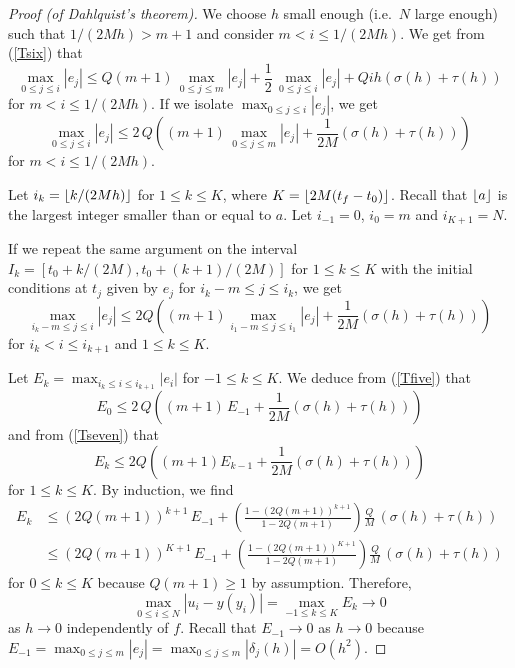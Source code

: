 \begin{proof}[Proof (of Dahlquist's theorem)]
We choose $h$ small enough (i.e.\ $N$ large enough) such
that $1/(2Mh) > m+1$ and consider $m < i \leq 1/(2Mh)$.  We get from
(\ref{Tsix}) that
\[
\max_{0\leq j \leq i} |e_j| \leq
Q(m+1)\,\max_{0\leq j \leq m} |e_j| + \frac{1}{2}\,\max_{0\leq j \leq i} |e_j|
+ Q i h\left(\sigma(h) + \tau(h) \right)
\]
for $m < i \leq 1/(2 M h)$. If we isolate 
$\displaystyle \max_{0\leq j \leq i} |e_j|$, we get
\begin{equation}\label{Tfive}
\max_{0\leq j \leq i} |e_j| \leq
2\,Q\left( (m+1)\,\max_{0\leq j \leq m} |e_j|
+\frac{1}{2M}\left(\sigma(h) + \tau(h) \right) \right)
\end{equation}
for $m < i \leq 1/(2 M h)$.

Let $i_k = \lfloor{k/(2M h)}\rfloor$ for $1 \leq k \leq K$, where
$K=\lfloor{2M(t_f-t_0)}\rfloor$.  Recall that $\lfloor{a}\rfloor$
is the largest integer smaller than or equal to $a$.  Let
$i_{-1} = 0$, $i_0=m$ and $i_{K+1} = N$.

If we repeat the same argument on the interval
$\displaystyle I_k = [t_0+k/(2M), t_0+(k+1)/(2M)]$ for $1 \leq k \leq K$
with the initial conditions at $t_j$ given by $e_j$ for
$\displaystyle i_k-m \leq j \leq i_k$, we get
\begin{equation}\label{Tseven}
\max_{i_k-m \leq j \leq i} |e_j| \leq 2 Q \left( (m+1)
\max_{i_1-m\leq j \leq i_1} |e_j|
+\frac{1}{2 M}\left(\sigma(h) + \tau(h) \right) \right)
\end{equation}
for $i_k < i \leq i_{k+1}$ and $1 \leq k \leq K$.

Let $\displaystyle E_k = \max_{i_k \leq i \leq i_{k+1}} |e_i|$ for
$-1 \leq k \leq K$.  We deduce from (\ref{Tfive}) that
\[
E_0 \leq 2\,Q\left( (m+1)\,E_{-1}
+\frac{1}{2M}\left(\sigma(h) + \tau(h) \right) \right)
\]
and from (\ref{Tseven}) that
\[
E_k \leq 2 Q \left( (m+1) E_{k-1}
+\frac{1}{2 M}\left(\sigma(h) + \tau(h) \right) \right)
\]
for $1 \leq k \leq K$.  By induction, we find
\begin{align*}
E_k & \leq
(2Q(m+1))^{k+1}\,E_{-1} + \left(\frac{1-(2Q(m+1))^{k+1}}{1-2Q(m+1)}\right)
\frac{Q}{M }\,\left(\sigma(h) +\tau(h)\right)  \\
& \leq
(2Q(m+1))^{K+1}\,E_{-1} + \left(\frac{1-(2Q(m+1))^{K+1}}{1-2Q(m+1)}\right)
\frac{Q}{M}\,\left(\sigma(h) +\tau(h)\right)
\end{align*}
for $0\leq k \leq K$ because $Q(m+1) \geq 1$ by assumption.
Therefore,
\[
\max_{0\leq i \leq N} | u_i - y(y_i) |
= \max_{-1\leq k \leq K} E_k \rightarrow 0
\]
as $h \rightarrow 0$ independently of $f$.  Recall that
$E_{-1} \rightarrow 0$ as $h \rightarrow 0$ because
$\displaystyle E_{-1} = \max_{0\leq j \leq m} |e_j|
= \max_{0\leq j \leq m} |\delta_j(h)| = O(h^2)$.
\end{proof}

